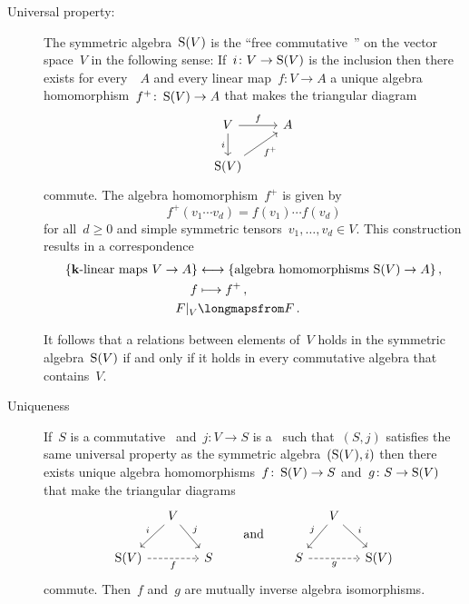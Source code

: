 \begin{recall}
\begin{description}
    \item[Universal property:]
      The symmetric algebra~$\operatorname{S}(V)$ is the \enquote{free commutative~{\algebra{$\kf$}}} on the vector space~$V$ in the following sense:
      If~$i \colon V \to \operatorname{S}(V)$ is the inclusion then there exists for every~{\algebra{$\kf$}}~$A$ and every linear map~$f \colon V \to A$ a unique algebra homomorphism~$f^+ \colon \operatorname{S}(V) \to A$ that makes the triangular diagram
      \[
        \begin{tikzcd}
          V
          \arrow{r}[above]{f}
          \arrow{d}[left]{i}
          &
          A
          \\
          \Symm(V)
          \arrow{ur}[below right]{f^+}
          &
          {}
        \end{tikzcd}
      \]
      commute.
      The algebra homomorphism~$f^+$ is given by
      \[
        f^+(v_1 \dotsm v_d)
        =
        f(v_1) \dotsm f(v_d)
      \]
      for all~$d \geq 0$ and simple symmetric tensors~$v_1, \dotsc, v_d \in V$.
      This construction results in a {\onetoone} correspondence
      \begin{align*}
        \{ \text{\linear{$\kf$} maps~$V \to A$} \}
        &\longonetoone
        \{ \text{algebra homomorphisms~$\Symm(V) \to A$} \} \,,
        \\
        f
        &\longmapsto
        f^+ \,,
        \\
        \restrict{F}{V}
        &\longmapsfrom
        F \,.
      \end{align*}
      
      It follows that a relations between elements of~$V$ holds in the symmetric algebra~$\operatorname{S}(V)$ if and only if it holds in every commutative algebra that contains~$V$.
      
    \item[Uniqueness]
      If~$S$ is a commutative~{\algebra{$\kf$}} and~$j \colon V \to S$ is a~{\linear{$\kf$}} such that~$(S, j)$ satisfies the same universal property as the symmetric algebra~$(\operatorname{S}(V), i)$  then there exists unique algebra homomorphisms~$f \colon \operatorname{S}(V) \to S$ and~$g \colon S \to \operatorname{S}(V)$ that make the triangular diagrams
      \[
        \begin{tikzcd}[column sep = small]
          {}
          &
          V
          \arrow{dl}[above left]{i}
          \arrow{dr}[above right]{j}
          &
          {}
          \\
          \Symm(V)
          \arrow[dashed]{rr}[below]{f}
          &
          {}
          &
          S
        \end{tikzcd}
        \qquad\text{and}\qquad
        \begin{tikzcd}[column sep = small]
          {}
          &
          V
          \arrow{dl}[above left]{j}
          \arrow{dr}[above right]{i}
          &
          {}
          \\
          S
          \arrow[dashed]{rr}[below]{g}
          &
          {}
          &
          \Symm(V)
        \end{tikzcd}
      \]
      commute.
      Then~$f$ and~$g$ are mutually inverse algebra isomorphisms.
      

\end{description}
\end{recall}

